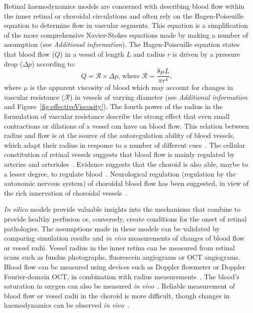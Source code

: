 \documentclass{article}
\begin{document}
Retinal haemodynamics models are concerned with describing blood flow within the inner retinal or choroidal circulations and often rely on the Hagen-Poiseuille equation to determine flow in vascular segments.
This equation is a simplification of the more comprehensive Navier-Stokes equations made by making a number of assumption (see \textit{Additional information}).
The Hagen-Poiseuille equation states that blood flow ($Q$) in a vessel of length $L$ and radius $r$ is driven by a pressure drop ($\Delta p$) according to:
\begin{equation*}
  \label{eq:Hagen-Poiseuille}
  Q = \mathcal R\times\Delta p \mbox{, where } \mathcal{R} = \frac{8\mu L}{\pi r^4},
\end{equation*}
where $\mu$ is the apparent viscosity of blood which may account for changes in vascular resistance ($\mathcal R$) in vessels of varying diameter (see \textit{Additional information} and Figure~\ref{fig:effectiveViscosity}).
The fourth power of the radius in the formulation of vascular resistance describe the strong effect that even small contractions or dilations of a vessel can have on blood flow.
This relation between radius and flow is at the source of the autoregulation ability of blood vessels, which adapt their radius in response to a number of different cues~\cite{Kur_2012}.
The cellular constitution of retinal vessels suggests that blood flow is mainly regulated by arteries and arterioles~\cite{An_2020,Kur_2012}.
Evidence suggests that the choroid is also able, maybe to a lesser degree, to regulate blood~\cite{Polska_2007,Riva_1997}.
Neurological regulation (regulation by the autonomic nervous system) of choroidal blood flow has been suggested, in view of the rich innervation of choroidal vessels~\cite{BeharCohen_2020,Polska_2007}.

\textit{In silico} models provide valuable insights into the mechanisms that combine to provide healthy perfusion or, conversely, create conditions for the onset of retinal pathologies.
The assumptions made in these models can be validated by comparing simulation results and \textit{in vivo} measurements of changes of blood flow or vessel radii.
Vessel radius in the inner retina can be measured from retinal scans such as fundus photographs, fluorescein angiograms or OCT angiograms.
Blood flow can be measured using devices such as Doppler flowmeter or Doppler Fourier-domain OCT, in combination with radius measurements~\cite{DoblhoffDier_2014,Wang_2009}.
The blood's saturation in oxygen can also be measured \textit{in vivo}~\cite{Geirsdottir_2013}.
Reliable measurement of blood flow or vessel radii in the choroid is more difficult, though changes in haemodynamics can be observed \textit{in vivo}~\cite{Riva_1997,Scherm_2019}.
\end{document}
